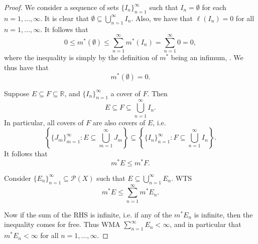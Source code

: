 \documentclass[notoc,notitlepage]{tufte-book}
\begin{document}
\begin{proof}
   We consider a sequence of sets $\{ I_n
  \}_{n=1}^{\infty}$ such that $I_n = \emptyset$ for each $n = 1, \ldots,
  \infty$. It is clear that $\emptyset \subseteq \bigcup_{n=1}^{\infty} I_n$.
  Also, we have that $\ell(I_n) = 0$ for all $n = 1, \ldots, \infty$. It follows
  that
  \begin{equation*}
    0 \leq m^*(\emptyset) \leq \sum_{n=1}^{\infty} m^* (I_n) =
    \sum_{n=1}^{\infty} 0 = 0,
  \end{equation*}
  where the inequality is simply by the definition of $m^*$ being an infimum,
  . We thus have that
  \begin{equation*}
    m^*(\emptyset) = 0.
  \end{equation*}

  \noindent
   Suppose $E \subseteq F \subseteq
  \mathbb{R}$, and $\{ I_n \}_{n=1}^{\infty}$ a cover of $F$. Then
  \begin{equation*}
    E \subseteq F \subseteq \bigcup_{n=1}^{\infty} I_n.
  \end{equation*}
  In particular, all covers of $F$ are also covers of $E$, i.e.
  \begin{equation*}
    \left\{ \{ J_m \}_{m=1}^{\infty} : E \subseteq \bigcup_{m=1}^{\infty} J_m \right\}
    \subseteq
    \left\{ \{ I_n \}_{n=1}^{\infty} : F \subseteq \bigcup_{n=1}^{\infty} I_n \right\}.
  \end{equation*}
  It follows that
  \begin{equation*}
    m^* E \leq m^* F.
  \end{equation*}

  \noindent
   Consider $\{ E_n \}_{n=1}^{\infty} \subseteq
  \mathcal{P}(X)$ such that $E \subseteq \bigcup_{n=1}^{\infty} E_n$. WTS
  \begin{equation*}
    m^* E \leq \sum_{n=1}^{\infty} m^* E_n.
  \end{equation*}

  Now if the sum of the RHS is infinite, i.e. if any of the $m^* E_n$ is
  infinite, then the inequality comes for free. Thus WMA $\sum_{n=1}^{\infty}
  E_n < \infty$, and in particular that $m^* E_n < \infty$ for all $n = 1,
  \ldots, \infty$.


\end{proof}
\end{document}
